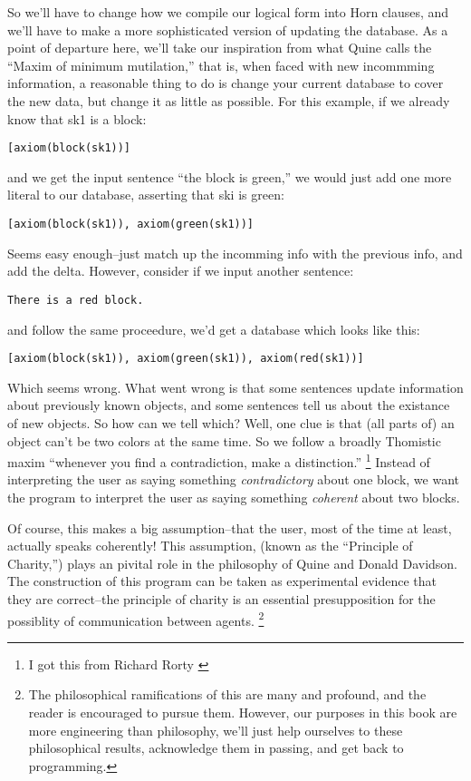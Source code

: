 \documentclass{book}[9pt]
\begin{document}
So we'll have to change how we compile our logical form into Horn
clauses, and we'll have to make a more sophisticated version of
updating the database.  As a point of departure here, we'll take our
inspiration from what Quine calls the ``Maxim of minimum mutilation,''
that is, when faced with new incommming information, a reasonable
thing to do is change your current database to cover the new data, but
change it as little as possible.  For this example, if we already know
that sk1 is a block:
\begin{verbatim}
[axiom(block(sk1))]
\end{verbatim}
\noindent and we get the input sentence ``the block is green,'' we
would just add one more literal to our database, asserting that 
ski is green:
\begin{verbatim}
[axiom(block(sk1)), axiom(green(sk1))]
\end{verbatim}
\noindent Seems easy enough--just match up the incomming info with
the previous info, and add the delta.  However, consider if we input
another sentence:
\begin{verbatim}
There is a red block.
\end{verbatim}
\noindent and follow the same proceedure, we'd get
a database which looks like this:
\begin{verbatim}
[axiom(block(sk1)), axiom(green(sk1)), axiom(red(sk1))]
\end{verbatim}
\noindent Which seems wrong.  What went wrong is that some sentences
update information about previously known objects, and some sentences
tell us about the existance of new objects.  So how can we tell which?
Well, one clue is that (all parts of) an object can't be two colors at
the same time.  So we follow a broadly Thomistic maxim ``whenever you
find a contradiction, make a distinction.'' \footnote{I got this from
  Richard Rorty \cite{rorty2000}} Instead of interpreting the user as
saying something {\em contradictory} about one block, we want the
program to interpret the user as saying something {\em coherent} about
two blocks.

Of course, this makes a big assumption--that the user, most of the
time at least, actually speaks coherently!  This assumption, (known as
the ``Principle of Charity,'') plays an pivital role in the philosophy
of Quine and Donald Davidson.  The construction of this program can be
taken as experimental evidence that they are correct--the principle of
charity is an essential presupposition for the possiblity of
communication between agents.  \footnote{The philosophical
ramifications of this are many and profound, and the reader is
encouraged to pursue them.  However, our purposes in this book are
more engineering than philosophy, we'll just help ourselves to these
philosophical results, acknowledge them in passing, and get back to
programming.}
\end{document}
